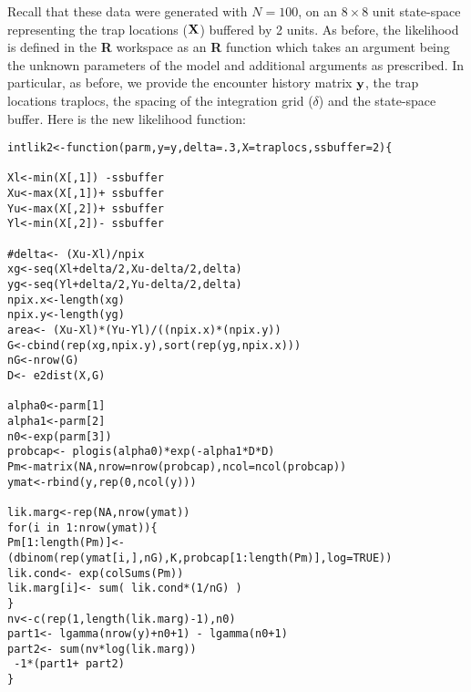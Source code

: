 Recall that these data were generated with $N=100$, on an $8 \times 8$ unit
state-space representing the trap locations (${\bf X}$) buffered by 2 units.
As before, the likelihood is defined in the {\bf R} workspace as an
{\bf R}
function which takes an argument being the unknown parameters of the
model and additional arguments as prescribed. In particular, as
before, we provide the encounter history matrix ${\bf y}$, the trap locations
traplocs, the spacing of the integration grid ($\delta$) and the
state-space buffer. Here is the new likelihood function:
\begin{verbatim}
intlik2<-function(parm,y=y,delta=.3,X=traplocs,ssbuffer=2){

Xl<-min(X[,1]) -ssbuffer
Xu<-max(X[,1])+ ssbuffer
Yu<-max(X[,2])+ ssbuffer
Yl<-min(X[,2])- ssbuffer

#delta<- (Xu-Xl)/npix
xg<-seq(Xl+delta/2,Xu-delta/2,delta) 
yg<-seq(Yl+delta/2,Yu-delta/2,delta) 
npix.x<-length(xg)
npix.y<-length(yg)
area<- (Xu-Xl)*(Yu-Yl)/((npix.x)*(npix.y))
G<-cbind(rep(xg,npix.y),sort(rep(yg,npix.x)))
nG<-nrow(G)
D<- e2dist(X,G) 

alpha0<-parm[1]
alpha1<-parm[2]
n0<-exp(parm[3])
probcap<- plogis(alpha0)*exp(-alpha1*D*D)
Pm<-matrix(NA,nrow=nrow(probcap),ncol=ncol(probcap))
ymat<-rbind(y,rep(0,ncol(y)))

lik.marg<-rep(NA,nrow(ymat))
for(i in 1:nrow(ymat)){
Pm[1:length(Pm)]<- (dbinom(rep(ymat[i,],nG),K,probcap[1:length(Pm)],log=TRUE))
lik.cond<- exp(colSums(Pm))
lik.marg[i]<- sum( lik.cond*(1/nG) )  
}                                                 
nv<-c(rep(1,length(lik.marg)-1),n0)
part1<- lgamma(nrow(y)+n0+1) - lgamma(n0+1)
part2<- sum(nv*log(lik.marg))
 -1*(part1+ part2)
}
\end{verbatim}

